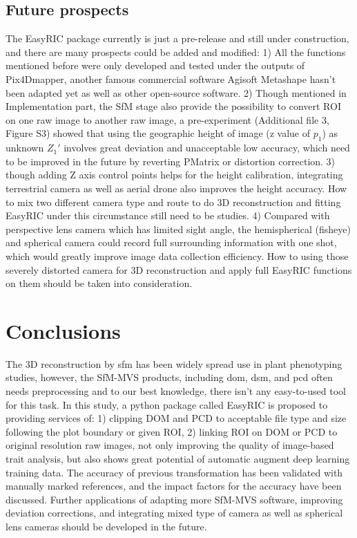 \documentclass{configs/bmcart}
\begin{document}
\subsection*{Future prospects}
The EasyRIC package currently is just a pre-release and still under construction, and there are many prospects could be added and modified: 1) All the functions mentioned before were only developed and tested under the outputs of Pix4Dmapper, another famous commercial software Agisoft Metashape hasn't been adapted yet as well as other open-source software. 2) Though mentioned in Implementation part, the SfM stage also provide the possibility to convert ROI on one raw image to another raw image, a pre-experiment (Additional file 3, Figure S3) showed that using the geographic height of image (z value of $p_1$) as unknown $Z_1'$ involves great deviation and unacceptable low accuracy, which need to be improved in the future by reverting PMatrix or distortion correction. 3) though adding Z axis control points helps for the height calibration, integrating terrestrial camera as well as aerial drone also improves the height accuracy. How to mix two different camera type and route to do 3D reconstruction and fitting EasyRIC under this circumstance still need to be studies. 4) Compared with perspective lens camera which has limited sight angle, the hemispherical (fisheye) and spherical camera could record full surrounding information with one shot, which would greatly improve image data collection efficiency. How to using those severely distorted camera for 3D reconstruction and apply full EasyRIC functions on them should be taken into consideration.

\section*{Conclusions}
The 3D reconstruction by \acrshort*{sfm} has been widely spread use in plant phenotyping studies, however, the SfM-MVS products, including \acrshort*{dom}, \acrshort*{dsm}, and \acrshort*{pcd} often needs preprocessing and to our best knowledge, there isn't any easy-to-used tool for this task. In this study, a python package called EasyRIC is proposed to providing services of: 1) clipping  DOM and PCD to acceptable file type and size following the plot boundary or given ROI, 2) linking ROI on DOM or PCD to original resolution raw images, not only improving the quality of image-based trait analysis, but also shows great potential of automatic augment deep learning training data. The accuracy of previous transformation has been validated with manually marked references, and the impact factors for the accuracy have been discussed. Further applications of adapting more SfM-MVS software, improving deviation corrections, and integrating mixed type of camera as well as spherical lens cameras should be developed in the future.
\end{document}
